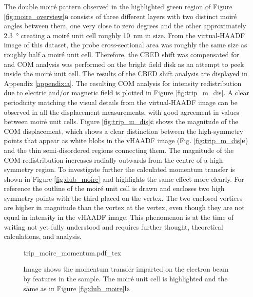 The double moiré pattern observed in the highlighted green region of Figure \ref{fig:moire_overview}\textbf{a} consists of three different layers with two distinct moiré angles between them, one very close to zero degrees and the other approximately \SI{2.3}{\degree} creating a moiré unit cell roughly \SI{10}{\nano\meter} in size. From the virtual-HAADF image of this dataset, the probe cross-sectional area was roughly the same size as roughly half a moiré unit cell. Therefore, the CBED shift was compensated for and COM analysis was performed on the bright field disk as an attempt to peek inside the moiré unit cell. The results of the CBED shift analysis are displayed in Appendix \ref{appendix:a}.
The resulting COM analysis for intensity redistribution due to electric and/or magnetic field is plotted in Figure \ref{fig:trip_m_dis}. A clear periodicity matching the visual details from the virtual-HAADF image can be observed in all the displacement measurements, with good agreement in values between moiré unit cells. Figure \ref{fig:trip_m_dis}\textbf{c} shows the magnitude of the COM displacement, which shows a clear distinction between the high-symmetry points that appear as white blobs in the vHAADF image (Fig. \ref{fig:trip_m_dis}\textbf{e}) and the thin semi-disordered regions connecting them. The magnitude of the COM redistribution increases radially outwards from the centre of a high-symmetry region. To investigate further the calculated momentum transfer is shown in Figure \ref{fig:dub_moire} and highlights the same effect more clearly. For reference the outline of the moiré unit cell is drawn and encloses two high symmetry points with the third placed on the vertex. The two enclosed vortices are higher in magnitude than the vortex at the vertex, even though they are not equal in intensity in the vHAADF image. This phenomenon is at the time of writing not yet fully understood and requires further thought, theoretical calculations, and analysis.


\begin{figure}
    \centering
    \def\svgwidth{.9\linewidth}
    {trip_moire_momentum.pdf_tex}
    \caption{Image shows the momentum transfer imparted on the electron beam by features in the sample. The moiré unit cell is highlighted and the same as in Figure \ref{fig:dub_moire}\textbf{b}.}
    \label{fig:trip_m_mom}
\end{figure}

